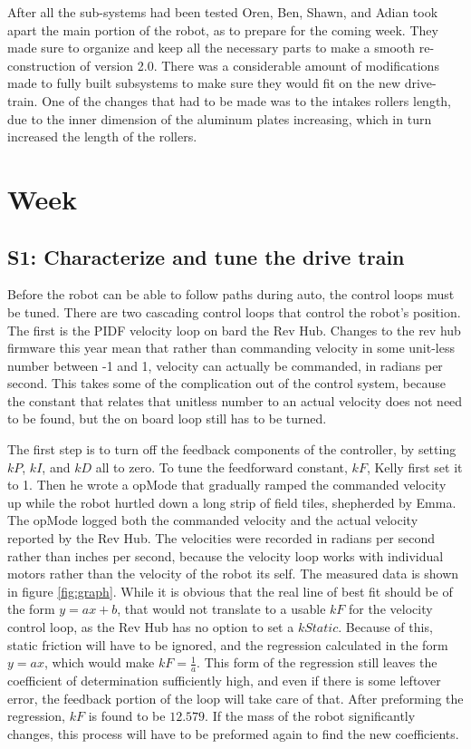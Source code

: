 \documentclass{article}
\begin{document}
After all the sub-systems had been tested Oren, Ben, Shawn, and Adian took apart the main portion of the robot, as to prepare for the coming week. They made sure to organize and keep all the necessary parts to make a smooth re-construction of version 2.0. There was a considerable amount of modifications made to fully built subsystems to make sure they would fit on the new drive-train. One of the changes that had to be made was to the intakes rollers length, due to the inner dimension of the aluminum plates increasing, which in turn increased the length of the rollers. 
\clearpage \newpage \section{Week \thesection} 
\subsection{S1: Characterize and tune the drive train}


Before the robot can be able to follow paths during auto, the control loops must be tuned. There are two cascading control loops that control the robot's position. The first is the PIDF velocity loop on bard the Rev Hub. Changes to the rev hub firmware this year mean that rather than commanding velocity in some unit-less number between -1 and 1, velocity can actually be commanded, in radians per second. This takes some of the complication out of the control system, because the constant that relates that unitless number to an actual velocity does not need to be found, but the on board loop still has to be turned. 

The first step is to turn off the feedback components of the controller, by setting $kP$, $kI$, and $kD$ all to zero. To tune the feedforward constant, $kF$, Kelly first set it to 1. Then he wrote a opMode that gradually ramped the commanded velocity up while the robot hurtled down a long strip of field tiles, shepherded by Emma. The opMode logged both the commanded velocity and the actual velocity reported by the Rev Hub. The velocities were recorded in radians per second rather than inches per second, because the velocity loop works with individual motors rather than the velocity of the robot its self. The measured data is shown in figure \ref{fig:graph}. While it is obvious that the real line of best fit should be of the form $y=ax+b$, that would not translate to a usable $kF$ for the velocity control loop, as the Rev Hub has no option to set a $kStatic$. Because of this, static friction will have to be ignored, and the regression calculated in the form $y=ax$, which would make $kF = \frac{1}{a}$. This form of the regression still leaves the coefficient of determination sufficiently high, and even if there is some leftover error, the feedback portion of the loop will take care of that. After preforming the regression, $kF$ is found to be $12.579$. If the mass of the robot significantly changes, this process will have to be preformed again to find the new coefficients.
\end{document}
